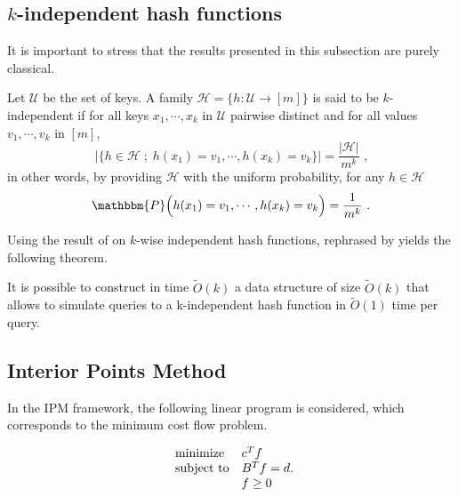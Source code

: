\subsection{$k$-independent hash functions}\label{ap:def-k-independent} It is
important to stress that the results presented in this subsection are purely
classical.
\begin{definition}\label{def:k-independent-hashing}
    Let $\mathcal U$ be the set of keys. A family $\mathcal H = \big\{ h : \mathcal
    U \rightarrow [m]\big\}$ is said to be $k$-independent if for all keys $x_1,
    \cdots, x_k$ in $\mathcal U$ pairwise distinct and for all values $v_1, \cdots,
    v_k$ in $[m]$,
    \begin{equation*}
        \big| \{ h \in \mathcal H \; ;\; h(x_1)=v_1, \cdots,  h(x_k)=v_k \} \big| =
        \frac{|\mathcal H |}{m^k} \text{ ,}
    \end{equation*}
    in other words, by providing $\mathcal H$ with the uniform probability, for any
    $h\in \mathcal H$
    \begin{equation*}
        \mathbbm{P}\Big(h(x_1)=v_1, \cdots,  h(x_k)=v_k \Big) = \frac{1}{m^k} \text{ .}
    \end{equation*}
\end{definition}
Using the result of \cite{christiani_independence_2015} on $k$-wise independent
hash functions, rephrased by \cite{apers_quantum_2020} yields the following
theorem.
\begin{theorem}\label{thm:k-indep-data-structure}
    It is possible to construct in time $\tilde O(k)$ a data structure of size
    $\tilde O(k)$ that allows to simulate queries to a k-independent hash
    function in $\tilde O(1)$ time per query.
\end{theorem}

\subsection{Interior Points Method}\label{ap:ipm}
In the IPM framework, the following linear program is considered, which
corresponds to the minimum cost flow problem.

\begin{equation}
    \begin{array}{ll@{}l}
    \text{minimize}  & c^T f \\
    \text{subject to}& B^Tf = d   \\
                     & f \geq 0
    \end{array} \text{.}
\end{equation}

